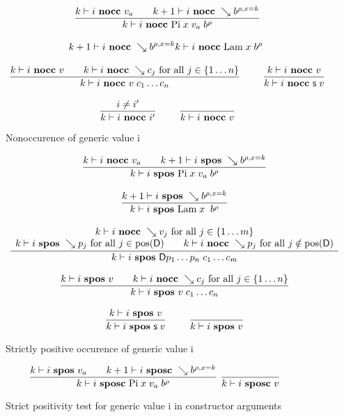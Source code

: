 \begin{figure}
\begin{gather*}
\ \dfrac{k\vdash i\mbox{ \textbf{nocc} }v_a \qquad k+1\vdash i\mbox{ \textbf{nocc} }\searrow b^{\rho,x=k}}{k\vdash i\mbox{ \textbf{nocc} }\mathrm{Pi} \; x \; v_a \; b^{\rho}  }
\\[2ex]
{k+1\vdash i\mbox{ \textbf{nocc} }\searrow b^{\rho,x=k}}
{k\vdash i\mbox{ \textbf{nocc} }\mathrm{Lam}\; x \; b^{\rho}  }
\\[2ex]
\ \dfrac{k\vdash i\mbox{ \textbf{nocc} }v \qquad k\vdash i\mbox{ \textbf{nocc} }\searrow c_j \mbox{ for all } j \in \{1 \ldots n \}}{k\vdash i\mbox{ \textbf{nocc} }v \; c_1 \ldots c_n}
\qquad
\ \dfrac{k\vdash i\mbox{ \textbf{nocc} }v}{k\vdash i\mbox{ \textbf{nocc} }\mathsf{s}\; v}
\\[2ex]
\ \dfrac{i \neq i'}{k\vdash i\mbox{ \textbf{nocc} }i'}
\qquad
\ \dfrac{}{k\vdash i\mbox{ \textbf{nocc} }v}
\end{gather*}
\caption{Nonoccurence of generic value i}
\end{figure}

\begin{figure}
\begin{gather*}
\ \dfrac{ k\vdash i\mbox{ \textbf{nocc} }v_a \qquad k+1\vdash i\mbox{ \textbf{spos} }\searrow b^{\rho,x=k}}{k\vdash i\mbox{ \textbf{spos} }\mathrm{Pi} \; x \; v_a \; b^{\rho}  }
\\[2ex]
\ \dfrac{k+1\vdash i\mbox{ \textbf{spos} }\searrow b^{\rho,x=k}}{k\vdash i\mbox{ \textbf{spos} }\mathrm{Lam} \; x \; \; b^{\rho}  }
\\[2ex]
\ \dfrac{\begin{array}[b]{c}k\vdash i\mbox{ \textbf{nocc} }\searrow v_j \mbox{ for all } j \in \{1 \ldots m \}\\k\vdash i\mbox{ \textbf{spos} }\searrow p_j \mbox{ for all } j \in \mbox{pos}(\mathsf{D}) \qquad k\vdash i\mbox{ \textbf{nocc} }\searrow p_j \mbox{ for all } j \notin \mbox{pos}(\mathsf{D}) \end{array}}{k\vdash i\mbox{ \textbf{spos} }\mathsf{D} p_1 \ldots p_n \; c_1 \ldots c_m}
\\[2ex]
\ \dfrac{k\vdash i\mbox{ \textbf{spos} }v \qquad k\vdash i\mbox{ \textbf{nocc} }\searrow c_j \mbox{ for all } j \in \{1 \ldots n \}}{k\vdash i\mbox{ \textbf{spos} }v \; c_1 \ldots c_n}
\\[2ex]
\ \dfrac{k\vdash i\mbox{ \textbf{spos} }v}{k\vdash i\mbox{ \textbf{spos} }\mathsf{s}\; v}
\qquad
\ \dfrac{}{k\vdash i\mbox{ \textbf{spos} }v}
\end{gather*}
\caption{Strictly positive occurence of generic value i}
\end{figure}


\begin{figure}
\label{sposcf}
\begin{gather*}
\ \dfrac{ k\vdash i\mbox{ \textbf{spos} }v_a \qquad k+1\vdash i\mbox{ \textbf{sposc} }\searrow b^{\rho,x=k}}{k\vdash i\mbox{ \textbf{sposc} }\mathrm{Pi} \; x \; v_a \; b^{\rho}  }
\ \dfrac{}{k\vdash i\mbox{ \textbf{sposc} }v}
\end{gather*}
\caption{Strict positivity test for generic value i in constructor arguments}
\end{figure}

